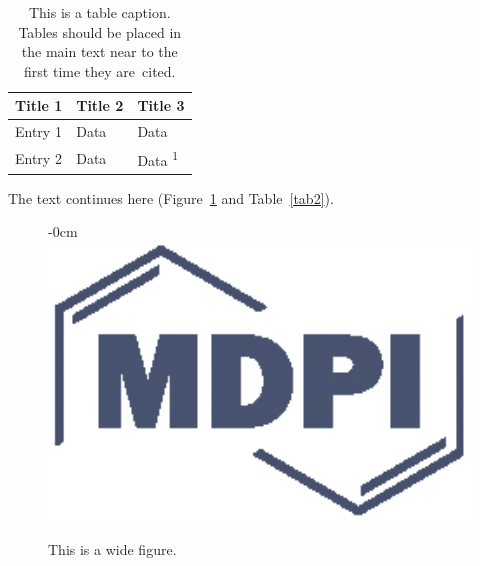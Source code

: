 \documentclass[journal,article,submit,pdftex,moreauthors]{Definitions/mdpi}
\begin{document}
\begin{table}[H] 
\caption{This is a table caption. Tables should be placed in the main text near to the first time they are~cited.\label{tab1}}
\begin{tabularx}{\textwidth}{CCC}
\toprule
\textbf{Title 1}	& \textbf{Title 2}	& \textbf{Title 3}\\
\midrule
Entry 1		& Data			& Data\\
Entry 2		& Data			& Data \textsuperscript{1}\\
\bottomrule
\end{tabularx}
\end{table}

The text continues here (Figure~\ref{fig2} and Table~\ref{tab2}).

\begin{figure}[H]
\begin{adjustwidth}{-\extralength}{0cm}
\centering
\includegraphics[width=15.5cm]{Definitions/logo-mdpi}
\end{adjustwidth}
\caption{This is a wide figure.\label{fig2}}
\end{figure}  
\end{document}
